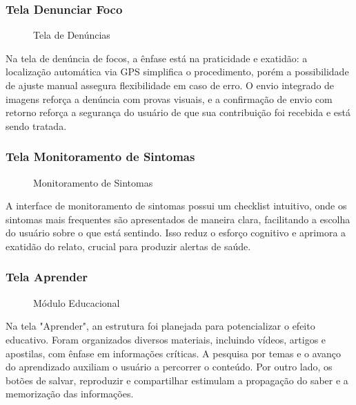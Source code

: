 \documentclass[a4paper, 12pt]{article}
\begin{document}
\subsubsection{Tela Denunciar Foco}

\begin{figure}[H]
  \centering
  \caption{Tela de Denúncias}
  \label{fig:denuncia}
\end{figure}

Na tela de denúncia de focos, a ênfase está na praticidade e exatidão: a localização automática via GPS simplifica o procedimento, porém a possibilidade de ajuste manual assegura flexibilidade em caso de erro.  O envio integrado de imagens reforça a denúncia com provas visuais, e a confirmação de envio com retorno reforça a segurança do usuário de que sua contribuição foi recebida e está sendo tratada.

\subsubsection{Tela Monitoramento de Sintomas}

\begin{figure}[H]
  \centering
  \caption{Monitoramento de Sintomas}
  \label{fig:sintomas}
\end{figure}

A interface de monitoramento de sintomas possui um checklist intuitivo, onde os sintomas mais frequentes são apresentados de maneira clara, facilitando a escolha do usuário sobre o que está sentindo.  Isso reduz o esforço cognitivo e aprimora a exatidão do relato, crucial para produzir alertas de saúde.

\subsubsection{Tela Aprender}

\begin{figure}[H]
  \centering
  \caption{Módulo Educacional}
  \label{fig:educacao}
\end{figure}

Na tela "Aprender", an estrutura foi planejada para potencializar o efeito educativo.  Foram organizados diversos materiais, incluindo vídeos, artigos e apostilas, com ênfase em informações críticas.  A pesquisa por temas e o avanço do aprendizado auxiliam o usuário a percorrer o conteúdo. Por outro lado, os botões de salvar, reproduzir e compartilhar estimulam a propagação do saber e a memorização das informações.
\end{document}
